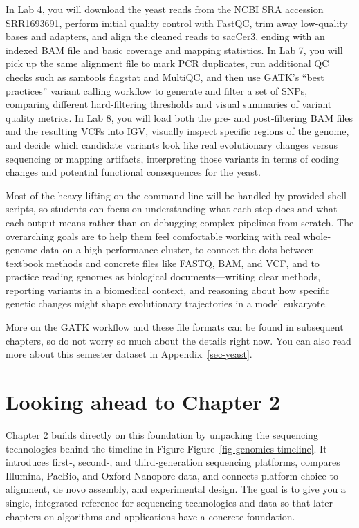 \documentclass[
  letterpaper,
  DIV=11,
  numbers=noendperiod]{scrreprt}
\begin{document}
In Lab 4, you will download the yeast reads from the NCBI SRA accession
SRR1693691, perform initial quality control with FastQC, trim away
low-quality bases and adapters, and align the cleaned reads to sacCer3,
ending with an indexed BAM file and basic coverage and mapping
statistics. In Lab 7, you will pick up the same alignment file to mark
PCR duplicates, run additional QC checks such as samtools flagstat and
MultiQC, and then use GATK's ``best practices'' variant calling workflow
to generate and filter a set of SNPs, comparing different hard-filtering
thresholds and visual summaries of variant quality metrics. In Lab 8,
you will load both the pre- and post-filtering BAM files and the
resulting VCFs into IGV, visually inspect specific regions of the
genome, and decide which candidate variants look like real evolutionary
changes versus sequencing or mapping artifacts, interpreting those
variants in terms of coding changes and potential functional
consequences for the yeast.

Most of the heavy lifting on the command line will be handled by
provided shell scripts, so students can focus on understanding what each
step does and what each output means rather than on debugging complex
pipelines from scratch. The overarching goals are to help them feel
comfortable working with real whole-genome data on a high-performance
cluster, to connect the dots between textbook methods and concrete files
like FASTQ, BAM, and VCF, and to practice reading genomes as biological
documents---writing clear methods, reporting variants in a biomedical
context, and reasoning about how specific genetic changes might shape
evolutionary trajectories in a model eukaryote.

More on the GATK workflow and these file formats can be found in
subsequent chapters, so do not worry so much about the details right
now. You can also read more about this semester dataset in
Appendix~\ref{sec-yeast}.

\section{Looking ahead to Chapter 2}\label{looking-ahead-to-chapter-2}

Chapter 2 builds directly on this foundation by unpacking the sequencing
technologies behind the timeline in Figure
Figure~\ref{fig-genomics-timeline}. It introduces first‑, second‑, and
third‑generation sequencing platforms, compares Illumina, PacBio, and
Oxford Nanopore data, and connects platform choice to alignment, de novo
assembly, and experimental design. The goal is to give you a single,
integrated reference for sequencing technologies and data so that later
chapters on algorithms and applications have a concrete foundation.
\end{document}
